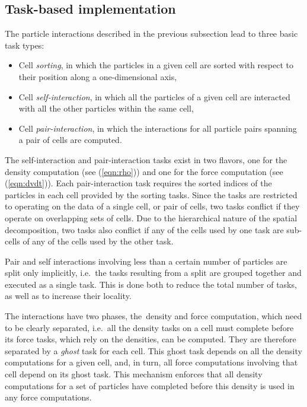 \documentclass[final]{siamltex}
\newcommand{\eqn}[1]
    {(\ref{eqn:#1})}
\begin{document}
\subsection{Task-based implementation}

The particle interactions described in the previous subsection
lead to three basic task types:
%
\begin{itemize}
    \item Cell {\em sorting}, in which the particles in a given
        cell are sorted with respect to their position along a
        one-dimensional axis,
    \item Cell {\em self-interaction}, in which all the particles
        of a given cell are interacted with all the other particles
        within the same cell,
    \item Cell {\em pair-interaction}, in which the interactions for
        all particle pairs spanning a pair of cells are computed. 
\end{itemize}
%
The self-interaction and pair-interaction tasks exist in
two flavors, one for the density computation (see \eqn{rho})
and one for the force computation (see \eqn{dvdt}).
Each pair-interaction task requires the sorted indices of
the particles in each cell provided by the sorting tasks.
Since the tasks are restricted to operating on the data of a
single cell, or pair of cells, two tasks conflict if they
operate on overlapping sets of cells.
Due to the hierarchical nature of the spatial decomposition,
two tasks also conflict if any of the cells used by one task
are sub-cells of any of the cells used by the other task.

Pair and self interactions involving less than a certain number
of particles are split only implicitly, i.e.~the tasks resulting
from a split are grouped together and executed as a single
task.
This is done both to reduce the total number of tasks,
as well as to increase their locality.

The interactions have two phases, the~density and force
computation, which need to be clearly separated, i.e.~all the density
tasks on a cell must complete before its force tasks, which
rely on the densities, can be computed.
They are therefore separated by a {\em ghost}
task for each cell.
This ghost task depends on all the density computations
for a given cell, and, in turn, all force computations involving
that cell depend on its ghost task.
This mechanism enforces that all density computations
for a set of particles have completed before this
density is used in any force computations.
\end{document}
